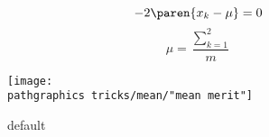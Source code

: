 %
\begin{equation}
    -2 \paren{ x_{k} - \mu } = 0
\end{equation}
%
%
\begin{equation}
    \mu = \frac{\sum_{k=1}^{2}} {m}
\end{equation}
%
\begin{figure}[htbp]
  \begin{center}
      \texttt{[image: \\pathgraphics tricks/mean/"mean merit"]}
    \caption{default}
    \label{default}
  \end{center}
\end{figure}

\endinput   %